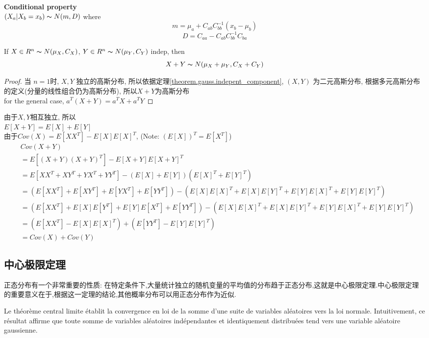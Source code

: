 \documentclass{article}
\begin{document}
\begin{fact}
\textbf{Conditional property}\\
$(X_a|X_b = x_b) \thicksim{N}(m, D)$ where
$$m = \mu_a + C_{ab} C_{bb}^{-1}(x_b - \mu_b)$$
$$D = C_{aa} - C_{ab} C_{bb}^{-1} C_{ba}$$
\end{fact}

\begin{theorem}
If $X \in R^n \thicksim{N}(\mu_X, C_X)$, $Y \in R^n \thicksim{N}(\mu_Y, C_Y)$
indep, then
$$X + Y \thicksim{N}(\mu_X + \mu_Y, C_X + C_Y)$$
\end{theorem}
\begin{proof}
当 $n=1$时, $X, Y$ 独立的高斯分布, 所以依据定理\ref{theorem.gauss.indepent_component}, $(X, Y)$ 为二元高斯分布, 根据多元高斯分布的定义(分量的线性组合仍为高斯分布), 所以$X+Y$为高斯分布\\
for the general case, $a^T (X+Y) = a^T X + a^T Y$
\end{proof}
由于$X,Y$相互独立, 所以\\
$E[X+Y] = E[X] + E[Y]$\\
由于$Cov(X) = E[XX^T] - E[X] E[X]^T$, (Note: $(E[X])^T = E[X^T]$)
$$
\begin{aligned}
& Cov(X+Y) \\
& = E[(X+Y)(X+Y)^T] - E[X+Y] E[X+Y]^T \\
& = E[X X^T + X Y^T + Y X^T + Y Y^T] - (E[X] + E[Y]) (E[X]^T+ E[Y]^T) \\
& = (E[X X^T] + E[X Y^T] + E[Y X^T] + E[Y Y^T]) - (E[X] E[X]^T + E[X] E[Y]^T + E[Y] E[X]^T + E[Y] E[Y]^T) \\
& = (E[X X^T] + E[X] E[Y^T] + E[Y] E[X^T] + E[Y Y^T]) - (E[X] E[X]^T + E[X] E[Y]^T + E[Y] E[X]^T + E[Y] E[Y]^T) \\
& = (E[X X^T] - E[X] E[X]^T) +  (E[Y Y^T] - E[Y] E[Y]^T) \\
& = Cov(X) + Cov(Y)
\end{aligned}
$$
\subsection{中心极限定理}
正态分布有一个非常重要的性质:
在特定条件下,大量统计独立的随机变量的平均值的分布趋于正态分布,这就是中心极限定理.中心极限定理的重要意义在于,根据这一定理的结论,其他概率分布可以用正态分布作为近似.

Le th\'eor\`eme central limite \'etablit la convergence en loi de la somme d'une suite de variables al\'eatoires vers la loi normale.
Intuitivement, ce r\'esultat affirme que toute somme de variables al\'eatoires ind\'ependantes et identiquement distribu\'ees tend vers
une variable al\'eatoire gaussienne.
\end{document}
